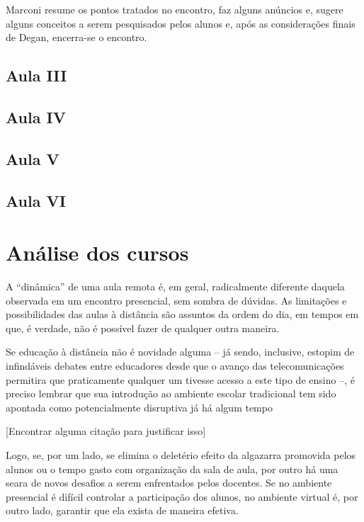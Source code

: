 \documentclass[12pt,a4paper]{article}
\begin{document}
	Marconi resume os pontos tratados no encontro, faz alguns anúncios e, 
	sugere alguns conceitos a serem pesquisados pelos alunos e, 
	após as considerações finais de Degan, encerra-se o encontro. 

	\subsection{Aula III}

	\subsection{Aula IV}

	\subsection{Aula V}

	\subsection{Aula VI}
	
	\newpage
		
	\section{Análise dos cursos}
	
	A “dinâmica” de uma aula remota é, em geral, radicalmente diferente 
	daquela observada em um encontro presencial, sem sombra de dúvidas. 
	As limitações e possibilidades das aulas à distância são assuntos da 
	ordem do dia, em tempos em que, é verdade, não é possível fazer de 
	qualquer outra maneira.

	Se educação à distância não é novidade alguma -- já sendo, inclusive, 
	estopim de infindáveis debates entre educadores desde que o avanço das 
	telecomunicações permitira que praticamente qualquer um tivesse acesso 
	a este tipo de ensino --, é preciso lembrar que sua introdução ao 
	ambiente escolar tradicional tem sido apontada como potencialmente 
	disruptiva já há algum tempo

	[Encontrar alguma citação para justificar isso]

	Logo, se, por um lado, se elimina o deletério efeito da algazarra 
	promovida pelos alunos ou o tempo gasto com organização da sala de 
	aula, por outro há uma seara de novos desafios a serem enfrentados 
	pelos docentes. Se no ambiente presencial é difícil controlar a 
	participação dos alunos, no ambiente virtual é, por outro lado, 
	garantir que ela exista de maneira efetiva. 
\end{document}
